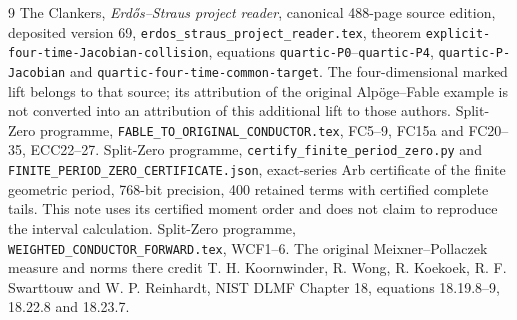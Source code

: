 \documentclass[11pt]{article}
\begin{document}
\begin{thebibliography}{9}
 The Clankers, \emph{Erd\H{o}s--Straus project reader},
canonical 488-page source edition, deposited version 69,
\texttt{erdos\_straus\_project\_reader.tex}, theorem
\texttt{explicit-four-time-Jacobian-collision}, equations
\texttt{quartic-P0}--\texttt{quartic-P4},
\texttt{quartic-P-Jacobian} and
\texttt{quartic-four-time-common-target}. The four-dimensional
marked lift belongs to that source; its attribution of the original
Alp\"oge--Fable example is not converted into an attribution of
this additional lift to those authors.
 Split-Zero programme,
\texttt{FABLE\_TO\_ORIGINAL\_CONDUCTOR.tex}, FC5--9,
FC15a and FC20--35, ECC22--27.
 Split-Zero programme,
\texttt{certify\_finite\_period\_zero.py} and
\texttt{FINITE\_PERIOD\_ZERO\_CERTIFICATE.json}, exact-series
Arb certificate of the finite geometric period, 768-bit precision,
400 retained terms with certified complete tails. This note uses
its certified moment order and does not claim to reproduce the
interval calculation.
 Split-Zero programme,
\texttt{WEIGHTED\_CONDUCTOR\_FORWARD.tex}, WCF1--6.
The original Meixner--Pollaczek measure and norms there credit
T. H. Koornwinder, R. Wong, R. Koekoek, R. F. Swarttouw and
W. P. Reinhardt, NIST DLMF Chapter 18, equations 18.19.8--9,
18.22.8 and 18.23.7.
\end{thebibliography}
\end{document}
